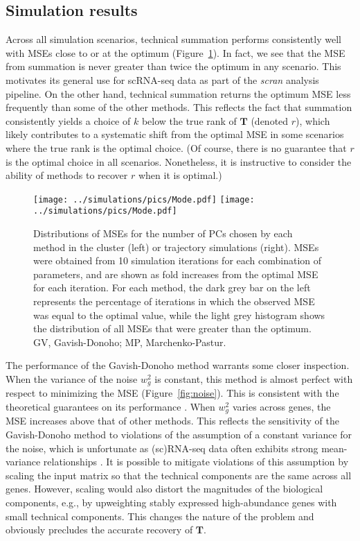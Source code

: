 \documentclass[10pt,letterpaper]{article}
\begin{document}
\subsection{Simulation results}
Across all simulation scenarios, technical summation performs consistently well with MSEs close to or at the optimum (Figure~\ref{fig:all}).
In fact, we see that the MSE from summation is never greater than twice the optimum in any scenario.
This motivates its general use for scRNA-seq data as part of the \textit{scran} analysis pipeline.
On the other hand, technical summation returns the optimum MSE less frequently than some of the other methods.
This reflects the fact that summation consistently yields a choice of $k$ below the true rank of $\mathbf{T}$ (denoted $r$), which likely contributes to a systematic shift from the optimal MSE in some scenarios where the true rank is the optimal choice.
(Of course, there is no guarantee that $r$ is the optimal choice in all scenarios.
Nonetheless, it is instructive to consider the ability of methods to recover $r$ when it is optimal.) 

\begin{figure}
\begin{center}
    \texttt{[image: ../simulations/pics/Mode.pdf]}
    \texttt{[image: ../simulations/pics/Mode.pdf]}
\end{center}
\caption{Distributions of MSEs for the number of PCs chosen by each method in the cluster (left) or trajectory simulations (right).
MSEs were obtained from 10 simulation iterations for each combination of parameters, and are shown as fold increases from the optimal MSE for each iteration.
For each method, the dark grey bar on the left represents the percentage of iterations in which the observed MSE was equal to the optimal value,
while the light grey histogram shows the distribution of all MSEs that were greater than the optimum.
GV, Gavish-Donoho; MP, Marchenko-Pastur.}
\label{fig:all}
\end{figure}

The performance of the Gavish-Donoho method warrants some closer inspection.
When the variance of the noise $w^2_g$ is constant, this method is almost perfect with respect to minimizing the MSE (Figure~\ref{fig:noise}).
This is consistent with the theoretical guarantees on its performance \cite{gavish2014optimal}.
When $w^2_g$ varies across genes, the MSE increases above that of other methods.
This reflects the sensitivity of the Gavish-Donoho method to violations of the assumption of a constant variance for the noise,
which is unfortunate as (sc)RNA-seq data often exhibits strong mean-variance relationships \cite{lun2016stepbystep,law2014voom}. 
It is possible to mitigate violations of this assumption by scaling the input matrix so that the technical components are the same across all genes.
However, scaling would also distort the magnitudes of the biological components, e.g., by upweighting stably expressed high-abundance genes with small technical components.
This changes the nature of the problem and obviously precludes the accurate recovery of $\mathbf{T}$.
\end{document}
